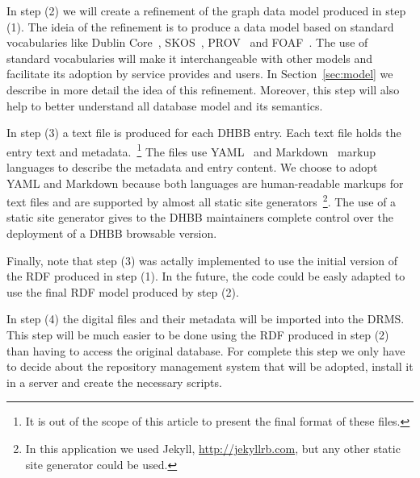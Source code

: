 
In step (2) we will create a refinement of the graph data model
produced in step (1). The ideia of the refinement is to produce a data
model based on standard vocabularies like Dublin Core~\cite{dc},
SKOS~\cite{skos}, PROV~\cite{prov} and FOAF~\cite{foaf}. The use of
standard vocabularies will make it interchangeable with other models
and facilitate its adoption by service provides and users. In
Section~\ref{sec:model} we describe in more detail the idea of this
refinement. Moreover, this step will also help to better understand
all database model and its semantics.

In step (3) a text file is produced for each DHBB entry. Each text
file holds the entry text and metadata.~\footnote{It is out of the
  scope of this article to present the final format of these files.}
The files use YAML~\cite{yaml} and Markdown~\cite{markdown} markup
languages to describe the metadata and entry content. We choose to
adopt YAML and Markdown because both languages are human-readable
markups for text files and are supported by almost all static site
generators~\footnote{In this application we used Jekyll,
  \url{http://jekyllrb.com}, but any other static site generator could
  be used.}. The use of a static site generator gives to the DHBB
maintainers complete control over the deployment of a DHBB browsable
version.



Finally, note that step (3) was actally implemented to use the initial
version of the RDF produced in step (1). In the future, the code could
be easly adapted to use the final RDF model produced by step (2).

In step (4) the digital files and their metadata will be imported into
the DRMS. This step will be much easier to be done using the RDF
produced in step (2) than having to access the original database. For
complete this step we only have to decide about the repository
management system that will be adopted, install it in a server and
create the necessary scripts.

